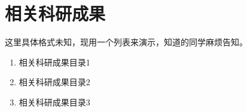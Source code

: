 
\chapter{相关科研成果}

这里具体格式未知，现用一个列表来演示，知道的同学麻烦告知。
\begin{enumerate}
	\item
	相关科研成果目录1
	\item 
	相关科研成果目录2
	\item 
	相关科研成果目录3
	
	
	
\end{enumerate}

